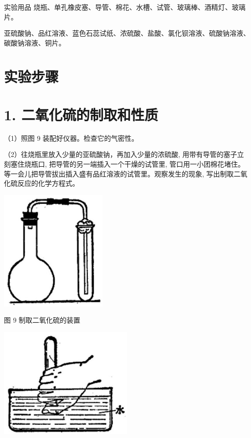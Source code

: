 \documentclass[10pt]{article}
\begin{document}
实验用品 烧瓶、单孔橡皮塞、导管、棉花、水槽、试管、玻璃棒、酒精灯、玻璃片。

亚硫酸钠、品红溶液、蓝色石蕊试纸、浓硫酸、盐酸、氯化钡溶液、硫酸钠溶液、碳酸钠溶液、铜片。

\section*{实验步骤}

\section*{1. 二氧化硫的制取和性质}

（1）照图 9 装配好仪器。检查它的气密性。

（2）往烧瓶里放入少量的亚硫酸钠，再加入少量的浓硫酸, 用带有导管的塞子立刻塞住烧瓶口, 把导管的另一端插入一个干燥的试管里, 管口用一小团棉花堵住。等一会儿把导管拔出插入盛有品红溶液的试管里。观察发生的现象, 写出制取二氧化硫反应的化学方程式。

\begin{center}
\includegraphics[max width=0.4\textwidth]{images/01912d0f-097c-7e75-8f32-4f326cd86c9f_161_417555.jpg}
\end{center}

图 9 制取二氧化硫的装置

\begin{center}
\includegraphics[max width=0.5\textwidth]{images/01912d0f-097c-7e75-8f32-4f326cd86c9f_161_418669.jpg}
\end{center}
\end{document}
